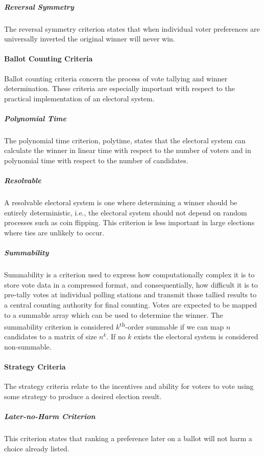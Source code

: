\subparagraph{Reversal Symmetry}
The reversal symmetry criterion states that when individual voter preferences
are universally inverted the original winner will never win.

\paragraph{Ballot Counting Criteria}
Ballot counting criteria concern the process of vote tallying and winner
determination. These criteria are especially important with respect to the
practical implementation of an electoral system.\cite{electoral-system-analysis,electoral-handbook,pr-computability}

\subparagraph{Polynomial Time}
The polynomial time criterion, polytime, states that the electoral system can
calculate the winner in linear time with respect to the number of voters and in
polynomial time with respect to the number of candidates.

\subparagraph{Resolvable}
A resolvable electoral system is one where determining a winner should be
entirely deterministic, i.e., the electoral system should not depend on random
processes such as coin flipping. This criterion is less important in large
elections where ties are unlikely to occur.

\subparagraph{Summability}
Summability is a criterion used to express how computationally complex it is to
store vote data in a compressed format, and consequentially, how difficult it is
to pre-tally votes at individual polling stations and transmit those tallied
results to a central counting authority for final counting. Votes are expected
to be mapped to a summable array which can be used to determine the winner. The
summability criterion is considered $k$\textsuperscript{th}-order summable if we
can map $n$ candidates to a matrix of size $n^k$. If no $k$ exists the electoral
system is considered non-summable.

\paragraph{Strategy Criteria}
The strategy criteria relate to the incentives and ability for voters to vote
using some strategy to produce a desired election result.\cite{electoral-system-analysis,stv-strategic-voting,electoral-handbook}

\subparagraph{Later-no-Harm Criterion}
This criterion states that ranking a preference later on a ballot will not harm
a choice already listed.

